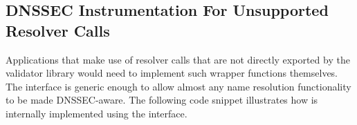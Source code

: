                                                                                                                              

\subsection{DNSSEC Instrumentation For Unsupported Resolver Calls}
\label{custom}
                                                                                                                             
                                                                                                                             
Applications that make use of resolver calls that are not directly exported by
the validator library would need to implement such wrapper functions themselves.
The  interface is generic enough to allow almost any 
name resolution functionality to be made DNSSEC-aware. The following code 
snippet illustrates how  is internally implemented 
using the  interface.

